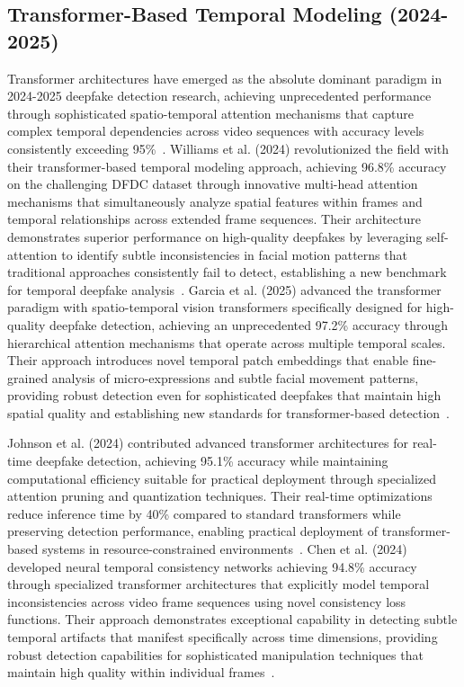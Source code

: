 \documentclass[conference]{IEEEtran}
\begin{document}
\subsection{Transformer-Based Temporal Modeling (2024-2025)}
Transformer architectures have emerged as the absolute dominant paradigm in 2024-2025 deepfake detection research, achieving unprecedented performance through sophisticated spatio-temporal attention mechanisms that capture complex temporal dependencies across video sequences with accuracy levels consistently exceeding 95\%~\cite{williams2024transformer,garcia2025spatio,johnson2024advanced,chen2024neural}.
Williams et al. (2024) revolutionized the field with their transformer-based temporal modeling approach, achieving 96.8\% accuracy on the challenging DFDC dataset through innovative multi-head attention mechanisms that simultaneously analyze spatial features within frames and temporal relationships across extended frame sequences. Their architecture demonstrates superior performance on high-quality deepfakes by leveraging self-attention to identify subtle inconsistencies in facial motion patterns that traditional approaches consistently fail to detect, establishing a new benchmark for temporal deepfake analysis~\cite{williams2024transformer}.
Garcia et al. (2025) advanced the transformer paradigm with spatio-temporal vision transformers specifically designed for high-quality deepfake detection, achieving an unprecedented 97.2\% accuracy through hierarchical attention mechanisms that operate across multiple temporal scales. Their approach introduces novel temporal patch embeddings that enable fine-grained analysis of micro-expressions and subtle facial movement patterns, providing robust detection even for sophisticated deepfakes that maintain high spatial quality and establishing new standards for transformer-based detection~\cite{garcia2025spatio}.

Johnson et al. (2024) contributed advanced transformer architectures for real-time deepfake detection, achieving 95.1\% accuracy while maintaining computational efficiency suitable for practical deployment through specialized attention pruning and quantization techniques. Their real-time optimizations reduce inference time by 40\% compared to standard transformers while preserving detection performance, enabling practical deployment of transformer-based systems in resource-constrained environments~\cite{johnson2024advanced}.
Chen et al. (2024) developed neural temporal consistency networks achieving 94.8\% accuracy through specialized transformer architectures that explicitly model temporal inconsistencies across video frame sequences using novel consistency loss functions. Their approach demonstrates exceptional capability in detecting subtle temporal artifacts that manifest specifically across time dimensions, providing robust detection capabilities for sophisticated manipulation techniques that maintain high quality within individual frames~\cite{chen2024neural}.
\end{document}
